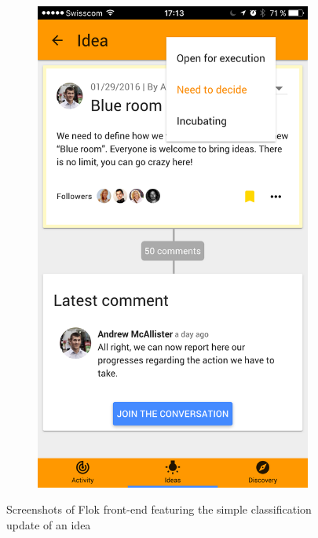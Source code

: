 \documentclass[a4paper,12pt, oneside]{article}
\begin{document}
\begin{figure}[!htb]
\begin{subfigure}{.32\textwidth}
        \includegraphics[width=\textwidth]{images/classificationSelect_selecting.png}
    \end{subfigure}
    \hfill\null
    \caption{Screenshots of Flok front-end featuring the simple classification update of an idea}
    \label{fig.classificationSelect}
\end{figure}
\end{document}
